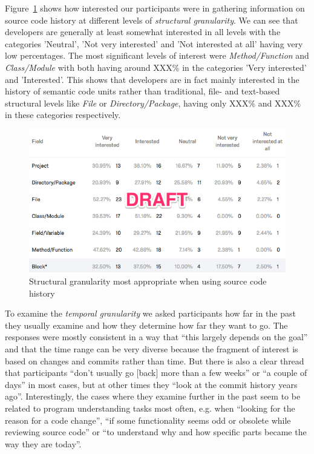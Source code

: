 \noindent
Figure~\ref{fig:structural_granularity} shows how interested our participants were in gathering information on source code history at different levels of \textit{structural granularity}. We can see that developers are generally at least somewhat interested in all levels with the categories 'Neutral', 'Not very interested' and 'Not interested at all' having very low percentages. The most significant levels of interest were \textit{Method/Function} and \textit{Class/Module} with both having around XXX\% in the categories 'Very interested' and 'Interested'. This shows that developers are in fact mainly interested in the history of semantic code units rather than traditional, file- and text-based structural levels like \textit{File} or \textit{Directory/Package}, having only XXX\% and XXX\% in these categories respectively.

\begin{figure}[t!]
  \includegraphics[width=0.98\columnwidth]{figures/structural_granularity}
  \caption{Structural granularity most appropriate when using source code history}
  \label{fig:structural_granularity}
\end{figure}


To examine the \textit{temporal granularity} we asked participants how far in the past they usually examine and how they determine how far they want to go. The responses were mostly consistent in a way that ``this largely depends on the goal'' and that the time range can be very diverse because the fragment of interest is based on changes and commits rather than time. But there is also a clear thread that participants ``don't usually go [back] more than a few weeks'' or ``a couple of days'' in most cases, but at other times they ``look at the commit history years ago''. Interestingly, the cases where they examine further in the past seem to be related to program understanding tasks most often, e.g. when ``looking for the reason for a code change'', ``if some functionality seems odd or obsolete while reviewing source code'' or ``to understand why and how specific parts became the way they are today''.

